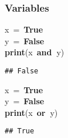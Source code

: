 \documentclass{beamer}\usepackage[]{graphicx}\usepackage[]{color}
\makeatletter
\newcommand{\hlopt}[1]{\textcolor[rgb]{0,0,0}{#1}}%
\newcommand{\hlstd}[1]{\textcolor[rgb]{0.345,0.345,0.345}{#1}}%
\newcommand{\hlkwa}[1]{\textcolor[rgb]{0.161,0.373,0.58}{\textbf{#1}}}%
\newenvironment{kframe}{%
 \def\at@end@of@kframe{}%
 \ifinner\ifhmode%
  \def\at@end@of@kframe{\end{minipage}}%
  \begin{minipage}{\columnwidth}%
 \fi\fi%
 \def\FrameCommand##1{\hskip\@totalleftmargin \hskip-\fboxsep
 \colorbox{shadecolor}{##1}\hskip-\fboxsep
     \hskip-\linewidth \hskip-\@totalleftmargin \hskip\columnwidth}%
 \MakeFramed {\advance\hsize-\width
   \@totalleftmargin\z@ \linewidth\hsize
   \@setminipage}}%
 {\par\unskip\endMakeFramed%
 \at@end@of@kframe}
\newenvironment{knitrout}{}{} %
\makeatother
\begin{document}
\begin{frame}[fragile]
\frametitle{Variables}
\begin{knitrout}
\color{fgcolor}\begin{kframe}
\noindent
\ttfamily
\hlstd{x\ }\hlopt{=\ }\hlstd{}\hlkwa{True}\hspace*{\fill}\\
\hlstd{y\ }\hlopt{=\ }\hlstd{}\hlkwa{False}\hspace*{\fill}\\
\hlstd{}\hlkwa{print}\hlstd{}\hlopt{(}\hlstd{x\ }\hlkwa{and\ }\hlstd{y}\hlopt{)}\hlstd{}\hspace*{\fill}
\mbox{}
\normalfont

\begin{verbatim}
## False
\end{verbatim}
\end{kframe}
\end{knitrout}

\begin{knitrout}
\color{fgcolor}\begin{kframe}
\noindent
\ttfamily
\hlstd{x\ }\hlopt{=\ }\hlstd{}\hlkwa{True}\hspace*{\fill}\\
\hlstd{y\ }\hlopt{=\ }\hlstd{}\hlkwa{False}\hspace*{\fill}\\
\hlstd{}\hlkwa{print}\hlstd{}\hlopt{(}\hlstd{x\ }\hlkwa{or\ }\hlstd{y}\hlopt{)}\hlstd{}\hspace*{\fill}
\mbox{}
\normalfont

\begin{verbatim}
## True
\end{verbatim}
\end{kframe}
\end{knitrout}
\end{frame}
\end{document}
